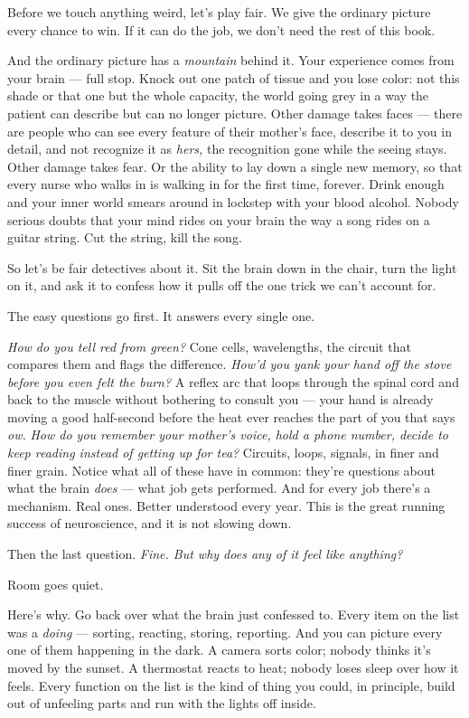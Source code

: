 \documentclass[11pt,openany]{book}
\begin{document}
Before we touch anything weird, let’s play fair. We give the ordinary picture every chance to win. If it can do the job, we don’t need the rest of this book.

And the ordinary picture has a \textit{mountain} behind it. Your experience comes from your brain — full stop. Knock out one patch of tissue and you lose color: not this shade or that one but the whole capacity, the world going grey in a way the patient can describe but can no longer picture. Other damage takes faces — there are people who can see every feature of their mother’s face, describe it to you in detail, and not recognize it as \textit{hers,} the recognition gone while the seeing stays. Other damage takes fear. Or the ability to lay down a single new memory, so that every nurse who walks in is walking in for the first time, forever. Drink enough and your inner world smears around in lockstep with your blood alcohol. Nobody serious doubts that your mind rides on your brain the way a song rides on a guitar string. Cut the string, kill the song.

So let’s be fair detectives about it. Sit the brain down in the chair, turn the light on it, and ask it to confess how it pulls off the one trick we can’t account for.

The easy questions go first. It answers every single one.

\textit{How do you tell red from green?} Cone cells, wavelengths, the circuit that compares them and flags the difference. \textit{How’d you yank your hand off the stove before you even felt the burn?} A reflex arc that loops through the spinal cord and back to the muscle without bothering to consult you — your hand is already moving a good half-second before the heat ever reaches the part of you that says \textit{ow.} \textit{How do you remember your mother’s voice, hold a phone number, decide to keep reading instead of getting up for tea?} Circuits, loops, signals, in finer and finer grain. Notice what all of these have in common: they’re questions about what the brain \textit{does} — what job gets performed. And for every job there’s a mechanism. Real ones. Better understood every year. This is the great running success of neuroscience, and it is not slowing down.

Then the last question. \textit{Fine. But why does any of it feel like anything?}

Room goes quiet.

Here’s why. Go back over what the brain just confessed to. Every item on the list was a \textit{doing} — sorting, reacting, storing, reporting. And you can picture every one of them happening in the dark. A camera sorts color; nobody thinks it’s moved by the sunset. A thermostat reacts to heat; nobody loses sleep over how it feels. Every function on the list is the kind of thing you could, in principle, build out of unfeeling parts and run with the lights off inside.
\end{document}
